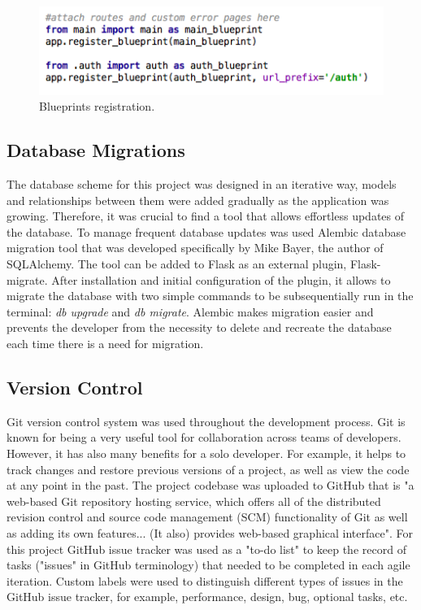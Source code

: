 \begin{figure}[H]
	\begin{center}
		\includegraphics[width=.60\linewidth,natwidth=610,natheight=642]{impl/images/blueprintsRegistration}
		\caption{Blueprints registration.} \label{fig:using:blueprintsRegistration}
	\end{center}
\end{figure}

\subsection{Database Migrations}
The database scheme for this project was designed in an iterative way, models and relationships between them were added gradually as the application was growing. Therefore, it was crucial to find a tool that allows effortless updates of the database. To manage frequent database updates was used Alembic database migration tool that was developed specifically by Mike Bayer, the author of SQLAlchemy. The tool can be added to Flask as an external plugin, Flask-migrate. After installation and initial configuration of the plugin, it allows to migrate the database with two simple commands to be subsequentially run in the terminal: \emph{db upgrade} and \emph{db migrate}. Alembic makes migration easier and prevents the developer from the necessity to delete and recreate the database each time there is a need for migration.

\subsection{Version Control}
Git version control system was used throughout the development process. Git is known for being a very useful tool for collaboration across teams of developers. However, it has also many benefits for a solo developer. For example, it helps to track changes and restore previous versions of a project, as well as view the code at any point in the past. The project codebase was uploaded to GitHub that is \cite{wiki:GitHub} "a web-based Git repository hosting service, which offers all of the distributed revision control and source code management (SCM) functionality of Git as well as adding its own features... (It also) provides web-based graphical interface". For this project GitHub issue tracker was used as a "to-do list" to keep the record of tasks ("issues" in GitHub terminology) that needed to be completed in each agile iteration. Custom labels were used to distinguish different types of issues in the GitHub issue tracker, for example, performance, design, bug, optional tasks, etc. 

